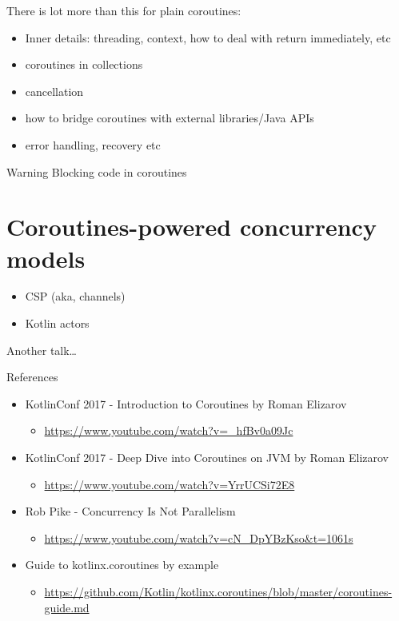 \documentclass[10pt]{beamer}
\begin{document}
\begin{frame}
	There is lot more than this for plain coroutines:
	\begin{itemize}
		\item Inner details: threading, context, how to deal with return immediately, etc
		\item coroutines  in collections
		\item cancellation 
		\item how to bridge coroutines with external libraries/Java APIs
		\item error handling, recovery etc 
	\end{itemize}
\end{frame}
\begin{frame}[fragile]
	\begin{alertblock}{Warning}
		Blocking code in coroutines
	\end{alertblock}
\end{frame}
\section{Coroutines-powered concurrency models}
\begin{frame}[fragile]
\begin{itemize}
	\item CSP (aka, channels) 
\item Kotlin actors 
	\end{itemize}
	Another talk\ldots 
\end{frame}

	\begin{frame}{References}
		\begin{itemize}
			\item KotlinConf 2017 - Introduction to Coroutines by Roman Elizarov
				\begin{itemize}
					\item \url{https://www.youtube.com/watch?v=_hfBv0a09Jc}
				\end{itemize}
			\item KotlinConf 2017 - Deep Dive into Coroutines on JVM by Roman Elizarov
				\begin{itemize}
					\item \url{https://www.youtube.com/watch?v=YrrUCSi72E8}
				\end{itemize}
			\item Rob Pike - Concurrency Is Not Parallelism
				\begin{itemize}
					\item \url{https://www.youtube.com/watch?v=cN_DpYBzKso&t=1061s}
				\end{itemize}
			\item Guide to kotlinx.coroutines by example 
				\begin{itemize}
					\item \url{https://github.com/Kotlin/kotlinx.coroutines/blob/master/coroutines-guide.md}
				\end{itemize}
		\end{itemize}
	\end{frame}

% 
% 
\end{document}
